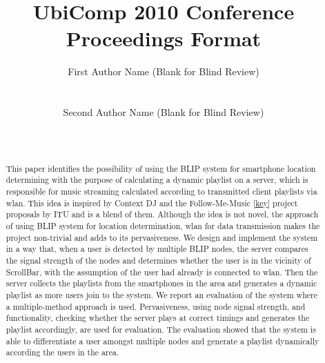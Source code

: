 \documentclass{ubicomp2010}
\begin{document}
\setlength{\paperheight}{11in}
\setlength{\paperwidth}{8.5in}
\setlength{\pdfpageheight}{\paperheight}
\setlength{\pdfpagewidth}{\paperwidth}




\title{UbiComp 2010 Conference Proceedings Format}
\author{
  \alignauthor First Author Name (Blank for Blind Review)\\
    \\
    \\
 \alignauthor Second Author Name (Blank for Blind Review)\\
    \\
    \\
      }
\maketitle

\begin{abstract}
This paper identifies the possibility of using the BLIP system for smartphone location determining with the purpose of calculating a dynamic playlist on a server, which is responsible for music streaming calculated according to transmitted client playlists via wlan. This idea is inspired by Context DJ and the Follow-Me-Music \ref{key} project proposals by ITU and is a blend of them. %
Although the idea is not novel, the approach of using BLIP system for location determination, wlan for data transmission makes the project non-trivial and adds to its pervasiveness.%
We design and implement the system in a way that, when a user is detected by multiple BLIP nodes, the server compares the signal strength of the nodes and determines whether the user is in the vicinity of ScrollBar, with the assumption of the user had already is connected to wlan. Then the server collects the playlists from the smartphones in the area and generates a dynamic playlist as more users join to the system.
We report an evaluation of the system where a multiple-method approach is used. Pervasiveness, using node signal strength, and functionality, checking whether the server plays at correct timings and generates the playlist accordingly, are used for evaluation.
The evaluation showed that the system is able to differentiate a user amongst multiple nodes and generate a playlist dynamically according the users in the area.


\end{abstract}
\end{document}
